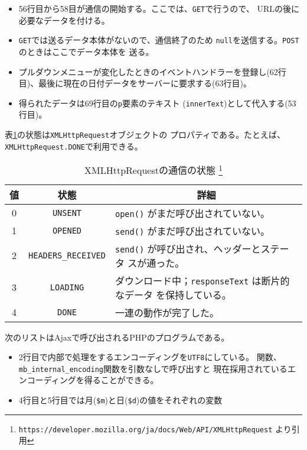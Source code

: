 \begin{Exec}
\begin{itemize}
 \item 56行目から58目が通信の開始する。ここでは、\texttt{GET}で行うので、
       URLの後に必要なデータを付ける。
 \item \texttt{GET}では送るデータ本体がないので、通信終了のため
       \texttt{null}を送信する。\texttt{POST}のときはここでデータ本体を
       送る。
 \item プルダウンメニューが変化したときのイベントハンドラーを登録し(62行
       目)、最後に現在の日付データをサーバーに要求する(63行目)。
 \item 得られたデータは69行目の\texttt{p}要素のテキスト
       (\texttt{innerText})として代入する(53行目)。
\end{itemize}
 表\ref{XMLHttpRequestRes}の状態は\texttt{XMLHttpRequest}オブジェクトの
 プロパティである。たとえば、\texttt{XMLHttpRequest.DONE}で利用できる。
 \begin{table}[ht]
	\caption{XMLHttpRequestの通信の状態
\protect\footnote{\protect\texttt{https://developer.mozilla.org/ja/docs/Web/API/XMLHttpRequest}
	より引用}} \label{XMLHttpRequestRes}
		\begin{tabular}{|c|c|m{}|}\hline
		 値&状態&\multicolumn{1}{c|}{詳細}\\\hline
		 0&\Verb+UNSENT+&\Verb+open()+ がまだ呼び出されていない。\\\hline
1&\Verb+OPENED+&\Verb+send()+ がまだ呼び出されていない。\\\hline
2&\Verb+HEADERS_RECEIVED+&\Verb+send()+ が呼び出され、ヘッダーとステータ
						 スが通った。\\\hline 
3&\Verb+LOADING+&ダウンロード中；\Verb+responseText+ は断片的なデータ
						 を保持している。\\\hline 
4&\Verb+DONE+&一連の動作が完了した。\\\hline
		\end{tabular}
 \end{table}

 次のリストはAjaxで呼び出されるPHPのプログラムである。
\begin{itemize}
 \item 2行目で内部で処理をするエンコーディングを\texttt{UTF8}にしている。
       関数、\texttt{mb\_internal\_encoding}関数を引数なしで呼び出すと
       現在採用されているエンコーディングを得ることができる。
 \item 4行目と5行目では月(\Verb+$m+)と日(\Verb+$d+)の値をそれぞれの変数

\end{itemize}
\end{Exec}
